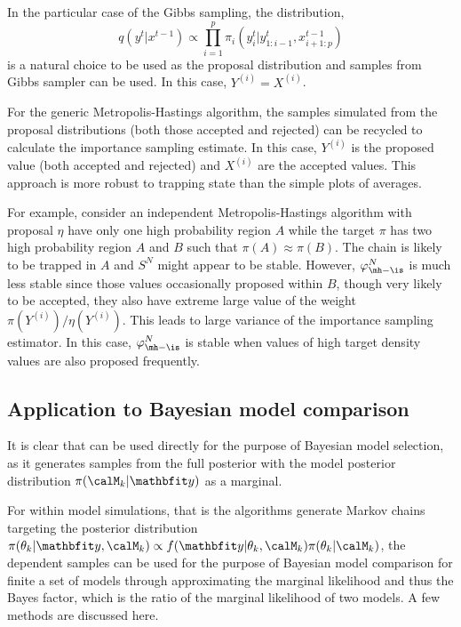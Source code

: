 
In the particular case of the Gibbs sampling, the distribution,
\begin{equation}
  q(y^t|x^{t-1}) \propto \prod_{i=1}^p \pi_i(y_i^t|y_{1:i-1}^t,x_{i+1:p}^{t-1})
\end{equation}
is a natural choice to be used as the proposal distribution and samples from
Gibbs sampler can be used. In this case, $Y^{(i)} = X^{(i)}$.

For the generic Metropolis-Hastings algorithm, the samples simulated from the
proposal distributions (both those accepted and rejected) can be recycled to
calculate the importance sampling estimate. In this case, $Y^{(i)}$ is the
proposed value (both accepted and rejected) and $X^{(i)}$ are the accepted
values. This approach is more robust to trapping state than the simple plots
of averages.

For example, consider an independent Metropolis-Hastings algorithm with
proposal $\eta$ have only one high probability region $A$ while the target
$\pi$ has two high probability region $A$ and $B$ such that
$\pi(A)\approx\pi(B)$. The chain is likely to be trapped in $A$ and $S^N$
might appear to be stable. However, $\varphi_{\mh-\is}^N$ is much less stable
since those values occasionally proposed within $B$, though very likely to be
accepted, they also have extreme large value of the weight
$\pi(Y^{(i)})/\eta(Y^{(i)})$. This leads to large variance of the importance
sampling estimator. In this case, $\varphi_{\mh-\is}^N$ is stable when values
of high target density values are also proposed frequently.

\subsection{Application to Bayesian model comparison}
\label{sub:MCMC Application to Bayesian model comparison}

It is clear that \rjmcmc can be used directly for the purpose of Bayesian
model selection, as it generates samples from the full posterior with the
model posterior distribution $\pi(\calM_k|\data)$ as a marginal.

For within model simulations, that is the algorithms generate Markov chains
targeting the posterior distribution $\pi(\theta_k|\data,\calM_k) \propto
f(\data|\theta_k,\calM_k)\pi(\theta_k|\calM_k)$, the dependent samples can be
used for the purpose of Bayesian model comparison for finite a set of models
through approximating the marginal likelihood and thus the Bayes factor, which
is the ratio of the marginal likelihood of two models. A few methods are
discussed here.


